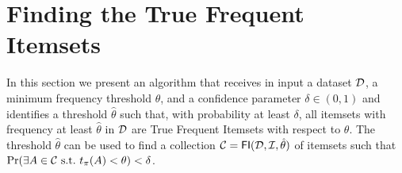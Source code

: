 \section{Finding the True Frequent Itemsets}\label{sec:main}
In this section we present an algorithm that receives in input a dataset ${\cal D}$,
a minimum frequency threshold $\theta$, and a confidence parameter
$\delta\in(0,1)$ and identifies a threshold $\hat{\theta}$ such
that, with probability at least $\delta$, all itemsets with frequency at least
$\hat{\theta}$ in ${\cal D}$ are True Frequent Itemsets with respect to $\theta$. %
The threshold $\hat{\theta}$ can be used to find a collection
$\mathcal{C}=\mathsf{FI}({\cal D},{\cal I},\hat\theta)$ of itemsets such that $\Pr(\exists
A\in\mathcal{C} \mbox{ s.t.~} t_\pi(A)<\theta)<\delta$.

\iffalse
It starts by building a set
$\mathcal{G}$ of ``candidates TFIs''. For each itemset
$A\in\mathcal{G}$ we evaluate the probability that $\tfreq(A)$ is less than $\theta$
by considering the probability that  $f(A)$ of $A$ in
the dataset is observed when $\tfreq(A) < \theta$. If
the frequency falls into the \emph{acceptance region} %
$[0,\theta+\varepsilon)$, where $\varepsilon$ is a function of $\delta$ and
$\mathcal{G}$ computed by our methods,
then $H_A$ is \emph{accepted}, otherwise $H_A$ is \emph{rejected}
and $A$ is flagged as True Frequent and included in the output collection
$\mathcal{C}$. Any
itemset not in $\mathcal{G}$ is not considered and will not
be reported in output. It should be clear that the definition of the acceptance
region is critical for the method to have the desired FWER at most
$\delta$: one needs to compute an $\varepsilon$ such that 
\[ 
\Pr\left(\exists A\in\mathcal{C}\mbox{ s.t. } \tfreq(A)<\theta\right)=\Pr\left(\exists A\in\mathcal{G} \mbox{ s.t. } \tfreq(A)<\theta \mbox{ and }
f(A)\ge\theta+\varepsilon\right)\le\delta\enspace.\]
\fi



